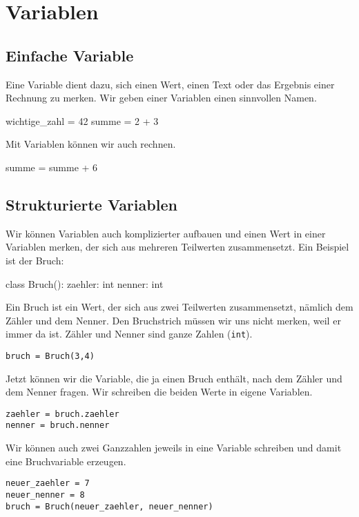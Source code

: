 \section{Variablen}

\subsection*{Einfache Variable}

Eine Variable dient dazu, sich einen Wert, einen Text oder das Ergebnis einer Rechnung zu merken. Wir geben einer Variablen einen sinnvollen Namen.

\begin{codePython}
wichtige_zahl = 42
summe = 2 + 3
\end{codePython}

Mit Variablen können wir auch rechnen.

\begin{codePython}
summe = summe + 6
\end{codePython}

\subsection*{Strukturierte Variablen}

Wir können Variablen auch komplizierter aufbauen und einen Wert in einer Variablen merken, der sich aus mehreren Teilwerten zusammensetzt. Ein Beispiel ist der Bruch:

\begin{codePython}
class Bruch():
	zaehler: int
	nenner: int
\end{codePython}

Ein Bruch ist ein Wert, der sich aus zwei Teilwerten zusammensetzt, nämlich dem Zähler und dem Nenner. Den Bruchstrich müssen wir uns nicht merken, weil er immer da ist. Zähler und Nenner sind ganze Zahlen (\texttt{int}).

\lstset{style=syntaxPython}
\begin{lstlisting}
bruch = Bruch(3,4)
\end{lstlisting}

Jetzt können wir die Variable, die ja einen Bruch enthält, nach dem Zähler und dem Nenner fragen. Wir schreiben die beiden Werte in eigene Variablen.

\begin{lstlisting}
zaehler = bruch.zaehler
nenner = bruch.nenner
\end{lstlisting}

Wir können auch zwei Ganzzahlen jeweils in eine Variable schreiben und damit eine Bruchvariable erzeugen.

\begin{lstlisting}
neuer_zaehler = 7
neuer_nenner = 8
bruch = Bruch(neuer_zaehler, neuer_nenner)
\end{lstlisting}